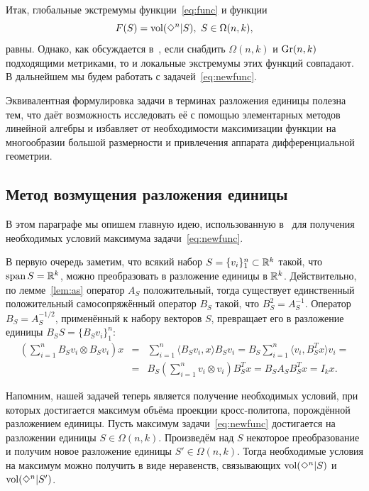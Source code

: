 \documentclass[a4paper,12pt]{article}
\def\vol{\mathop{\rm vol}}
\def\span{\mathop{\rm span}}
\def\Gr{\mathbf{\rm Gr}}
\newcommand{\crosp}{\Diamond}
\newcommand{\lb}[1]{#1\nobreak\discretionary{}{\hbox{\ensuremath{#1}}}{}}
\numberwithin{equation}{section}
\begin{document}
	Итак, глобальные экстремумы функции~\eqref{eq:func} и функции
		\begin{equation}\label{eq:newfunc}
			F(S)=\vol(\crosp^n|S),\ S\in\Omega(n,k),
		\end{equation}
	равны. Однако, как обсуждается в~\cite{crospol}, если снабдить $\Omega(n,k)$ и $\Gr(n,k)$ подходящими метриками, то и локальные экстремумы этих функций совпадают. В дальнейшем мы будем работать с задачей~\eqref{eq:newfunc}.

	Эквивалентная формулировка задачи в терминах разложения единицы полезна тем, что даёт возможность исследовать её с помощью элементарных методов линейной алгебры и избавляет от необходимости максимизации функции на многообразии большой размерности и привлечения аппарата дифференциальной геометрии.

	\subsection{Метод возмущения разложения единицы}
	В этом параграфе мы опишем главную идею, использованную в~\cite{crospol} для получения необходимых условий максимума задачи~\eqref{eq:newfunc}.

	В первую очередь заметим, что всякий набор $S=\{v_i\}_1^n\subset\mathbb {R}^k$ такой, что $\span S\lb=\RR^k$, можно преобразовать в разложение единицы в $\mathbb {R}^k$. Действительно, по лемме~\ref{lem:as} оператор $A_S$ положительный, тогда существует единственный положительный самосопряжённый оператор $B_S$ такой, что $B_S^2=A_S^{-1}$. Оператор $B_S=A_S^{-1/2}$, применённый к набору векторов $S$, превращает его в разложение единицы $B_SS=\{B_Sv_i\}_1^n$:
	\begin{eqnarray*}
		\left(\sum_{i=1}^nB_Sv_i\otimes B_Sv_i\right)x&=&\sum_{i=1}^n\langle B_Sv_i,x\rangle B_Sv_i=B_S\sum_{i=1}^n\langle v_i,B_S^Tx\rangle v_i=\\
			&=&B_S\left(\sum_{i=1}^n v_i\otimes v_i\right)B_S^Tx=B_SA_SB_S^Tx=I_kx.
	\end{eqnarray*}

	Напомним, нашей задачей теперь является получение необходимых условий, при которых достигается максимум объёма проекции кросс-политопа, порождённой разложением единицы. Пусть максимум задачи~\eqref{eq:newfunc} достигается на разложении единицы $S\in\Omega(n,k)$. Произведём над $S$ некоторое преобразование и получим новое разложение единицы $S'\in\Omega(n,k)$. Тогда необходимые условия на максимум можно получить в виде неравенств, связывающих $\vol(\crosp^n|S)$ и $\vol(\crosp^n|S')$.
\end{document}
